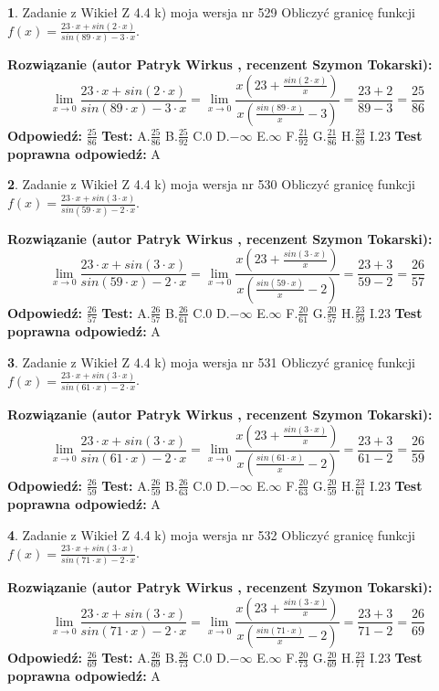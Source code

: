 \documentclass[12pt, a4paper]{article}
\theoremstyle{definition} %
\newtheorem{zad}{}
\newcommand{\zadStart}[1]{\begin{zad}#1\newline}
\newcommand{\zadStop}{\end{zad}}
\newcommand{\rozwStart}[2]{\noindent \textbf{Rozwiązanie (autor #1 , recenzent #2): }\newline}
\newcommand{\rozwStop}{\newline}
\newcommand{\odpStart}{\noindent \textbf{Odpowiedź:}\newline}
\newcommand{\odpStop}{\newline}
\newcommand{\testStart}{\noindent \textbf{Test:}\newline}
\newcommand{\testStop}{\newline}
\newcommand{\kluczStart}{\noindent \textbf{Test poprawna odpowiedź:}\newline}
\newcommand{\kluczStop}{\newline}
\begin{document}
\zadStart{Zadanie z Wikieł Z 4.4 k) moja wersja nr 529}
Obliczyć granicę funkcji $f(x)=\frac{23\cdot x +sin(2\cdot x)}{sin(89\cdot x) -3\cdot x}$.
\zadStop
\rozwStart{Patryk Wirkus}{Szymon Tokarski}
$$\lim\limits_{x\to 0}\frac{23\cdot x +sin(2\cdot x)}{sin(89\cdot x) -3\cdot x}
=\lim\limits_{x\to 0}\frac{x(23+\frac{sin(2\cdot x)}{x})}{x(\frac{sin(89\cdot x)}{x}-3)}
=\frac{23+2}{89-3} = \frac{25}{86}$$
\rozwStop
\odpStart
$\frac{25}{86}$
\odpStop
\testStart
A.$\frac{25}{86}$
B.$\frac{25}{92}$
C.$0$
D.$-\infty$
E.$\infty$
F.$\frac{21}{92}$
G.$\frac{21}{86}$
H.$\frac{23}{89}$
I.$23$
\testStop
\kluczStart
A
\kluczStop



\zadStart{Zadanie z Wikieł Z 4.4 k) moja wersja nr 530}
Obliczyć granicę funkcji $f(x)=\frac{23\cdot x +sin(3\cdot x)}{sin(59\cdot x) -2\cdot x}$.
\zadStop
\rozwStart{Patryk Wirkus}{Szymon Tokarski}
$$\lim\limits_{x\to 0}\frac{23\cdot x +sin(3\cdot x)}{sin(59\cdot x) -2\cdot x}
=\lim\limits_{x\to 0}\frac{x(23+\frac{sin(3\cdot x)}{x})}{x(\frac{sin(59\cdot x)}{x}-2)}
=\frac{23+3}{59-2} = \frac{26}{57}$$
\rozwStop
\odpStart
$\frac{26}{57}$
\odpStop
\testStart
A.$\frac{26}{57}$
B.$\frac{26}{61}$
C.$0$
D.$-\infty$
E.$\infty$
F.$\frac{20}{61}$
G.$\frac{20}{57}$
H.$\frac{23}{59}$
I.$23$
\testStop
\kluczStart
A
\kluczStop



\zadStart{Zadanie z Wikieł Z 4.4 k) moja wersja nr 531}
Obliczyć granicę funkcji $f(x)=\frac{23\cdot x +sin(3\cdot x)}{sin(61\cdot x) -2\cdot x}$.
\zadStop
\rozwStart{Patryk Wirkus}{Szymon Tokarski}
$$\lim\limits_{x\to 0}\frac{23\cdot x +sin(3\cdot x)}{sin(61\cdot x) -2\cdot x}
=\lim\limits_{x\to 0}\frac{x(23+\frac{sin(3\cdot x)}{x})}{x(\frac{sin(61\cdot x)}{x}-2)}
=\frac{23+3}{61-2} = \frac{26}{59}$$
\rozwStop
\odpStart
$\frac{26}{59}$
\odpStop
\testStart
A.$\frac{26}{59}$
B.$\frac{26}{63}$
C.$0$
D.$-\infty$
E.$\infty$
F.$\frac{20}{63}$
G.$\frac{20}{59}$
H.$\frac{23}{61}$
I.$23$
\testStop
\kluczStart
A
\kluczStop



\zadStart{Zadanie z Wikieł Z 4.4 k) moja wersja nr 532}
Obliczyć granicę funkcji $f(x)=\frac{23\cdot x +sin(3\cdot x)}{sin(71\cdot x) -2\cdot x}$.
\zadStop
\rozwStart{Patryk Wirkus}{Szymon Tokarski}
$$\lim\limits_{x\to 0}\frac{23\cdot x +sin(3\cdot x)}{sin(71\cdot x) -2\cdot x}
=\lim\limits_{x\to 0}\frac{x(23+\frac{sin(3\cdot x)}{x})}{x(\frac{sin(71\cdot x)}{x}-2)}
=\frac{23+3}{71-2} = \frac{26}{69}$$
\rozwStop
\odpStart
$\frac{26}{69}$
\odpStop
\testStart
A.$\frac{26}{69}$
B.$\frac{26}{73}$
C.$0$
D.$-\infty$
E.$\infty$
F.$\frac{20}{73}$
G.$\frac{20}{69}$
H.$\frac{23}{71}$
I.$23$
\testStop
\kluczStart
A
\kluczStop
\end{document}
